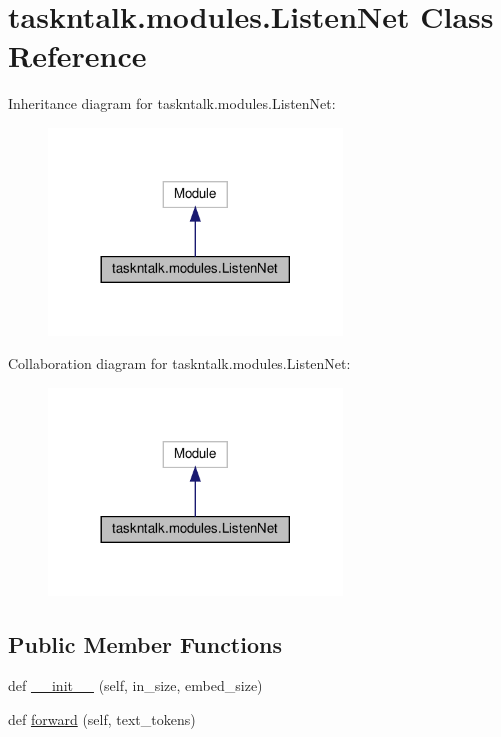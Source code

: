 \hypertarget{classtaskntalk_1_1modules_1_1ListenNet}{}\section{taskntalk.\+modules.\+Listen\+Net Class Reference}
\label{classtaskntalk_1_1modules_1_1ListenNet}


Inheritance diagram for taskntalk.\+modules.\+Listen\+Net\+:
\nopagebreak
\begin{figure}[H]
\begin{center}
\leavevmode
\includegraphics[width=221pt]{classtaskntalk_1_1modules_1_1ListenNet__inherit__graph}
\end{center}
\end{figure}


Collaboration diagram for taskntalk.\+modules.\+Listen\+Net\+:
\nopagebreak
\begin{figure}[H]
\begin{center}
\leavevmode
\includegraphics[width=221pt]{classtaskntalk_1_1modules_1_1ListenNet__coll__graph}
\end{center}
\end{figure}
\subsection*{Public Member Functions}
\begin{DoxyCompactItemize}
\item 
def \hyperlink{classtaskntalk_1_1modules_1_1ListenNet_ae2da147c71b06ac6c35f5f76b4972408}{\+\_\+\+\_\+init\+\_\+\+\_\+} (self, in\+\_\+size, embed\+\_\+size)
\item 
def \hyperlink{classtaskntalk_1_1modules_1_1ListenNet_a5409dc9b3f02d6a4fc6046dcdfa4122e}{forward} (self, text\+\_\+tokens)
\end{DoxyCompactItemize}

